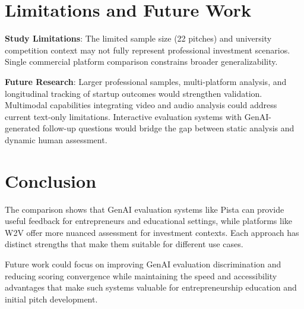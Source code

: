 \section{Limitations and Future Work}
\label{sec:limitations}

\textbf{Study Limitations}: The limited sample size (22 pitches) and university competition context may not fully represent professional investment scenarios. Single commercial platform comparison constrains broader generalizability.

\textbf{Future Research}: Larger professional samples, multi-platform analysis, and longitudinal tracking of startup outcomes would strengthen validation. Multimodal capabilities integrating video and audio analysis could address current text-only limitations. Interactive evaluation systems with GenAI-generated follow-up questions would bridge the gap between static analysis and dynamic human assessment.

\section{Conclusion}
\label{sec:conclusion}

The comparison shows that GenAI evaluation systems like Pista can provide useful feedback for entrepreneurs and educational settings, while platforms like W2V offer more nuanced assessment for investment contexts. Each approach has distinct strengths that make them suitable for different use cases.

Future work could focus on improving GenAI evaluation discrimination and reducing scoring convergence while maintaining the speed and accessibility advantages that make such systems valuable for entrepreneurship education and initial pitch development.